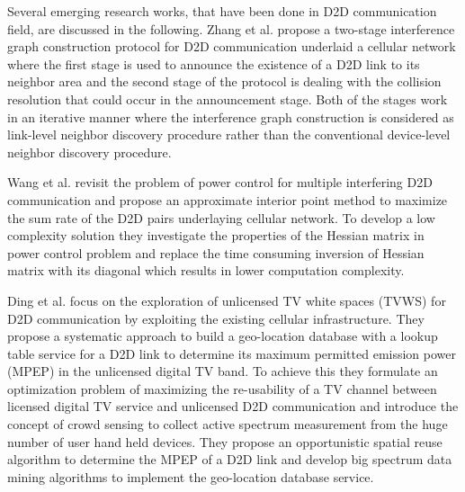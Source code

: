 \documentclass{ieeeaccess}
\begin{document}
\smallskip
 
Several emerging research works, that have been done in D2D communication field, are discussed in the following. Zhang et al. \cite{zhang2017interference} propose a two-stage interference graph construction protocol for D2D communication underlaid a cellular network where the first stage is used to announce the existence of a D2D link to its neighbor area and the second stage of the protocol is dealing with the collision resolution that could occur in the announcement stage. Both of the stages work in an iterative manner where the interference graph construction is considered as link-level neighbor discovery procedure rather than the conventional device-level neighbor discovery procedure.


\smallskip
 
Wang et al. \cite{wang2017power} revisit the problem of power control for multiple interfering D2D communication and propose an approximate interior point method to maximize the sum rate of the D2D pairs underlaying cellular network. To develop a low complexity solution they investigate the properties of the Hessian matrix in power control problem and replace the time consuming inversion of Hessian matrix with its diagonal which results in lower computation complexity.
 


\smallskip
 
Ding et al. \cite{ding2016cellular} focus on the exploration of unlicensed TV white spaces (TVWS) for D2D communication by exploiting the existing cellular infrastructure. They propose a systematic approach to build a geo-location database with a lookup table service for a D2D link to determine its maximum permitted emission power (MPEP) in the unlicensed digital TV band. To achieve this they formulate an optimization problem of maximizing the re-usability of a TV channel between licensed digital TV service and unlicensed D2D communication and introduce the concept of crowd sensing to collect active spectrum measurement from the huge number of user hand held devices. They propose an opportunistic spatial reuse algorithm  to determine the MPEP of a D2D link and develop big spectrum data mining algorithms to implement the geo-location database service.


\smallskip
 
\end{document}
